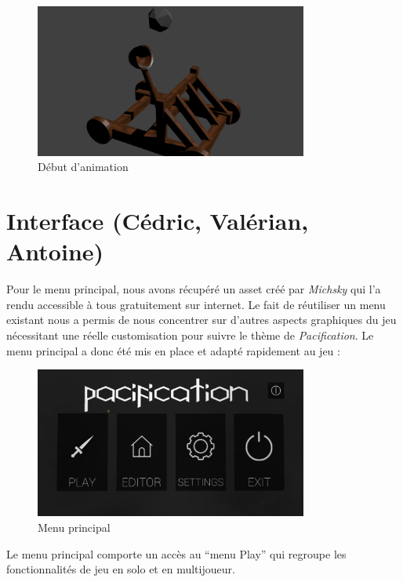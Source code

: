 \documentclass[12pt]{report}
\begin{document}
\begin{figure}[H]
    \centering
    \includegraphics[width=0.8\textwidth]{CatapulteAnimation}
    \caption{Début d'animation}
\end{figure}

\section{Interface (Cédric, Valérian, Antoine)}

Pour le menu principal, nous avons récupéré un asset créé par \textit{Michsky}
qui l’a rendu accessible à tous gratuitement sur internet. Le fait de
réutiliser un menu existant nous a permis de nous concentrer sur d'autres
aspects graphiques du jeu nécessitant une réelle customisation pour suivre le
thème de \textit{Pacification}. Le menu principal a donc été mis en place et
adapté rapidement au jeu :

\begin{figure}[H]
    \centering
    \includegraphics[width=0.8\textwidth]{MainMenuScreen}
    \caption{Menu principal}
\end{figure}

Le menu principal comporte un accès au “menu Play” qui regroupe les
fonctionnalités de jeu en solo et en multijoueur.
\end{document}
